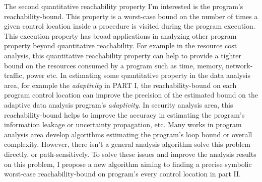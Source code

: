 The second quantitative reachability property I'm interested is the program's reachability-bound.
This property is a worst-case bound on the number of times a given control location 
 inside a procedure is visited during the program execution.
This execution property has broad
applications in analyzing other program property beyond quantitative reachability.
For example in the resource cost analysis, this quantitative reachability property
can help to provide a tighter
bound on the resources consumed by a program such as time, memory,
network-traffic, power etc.
In estimating some quantitative property
in the data analysis area, for example the \emph{adaptivity}
in PART I, the reachability-bound on each program control location
can improve the precision of the estimated bound on the adaptive data analysis program's \emph{adaptivity}.
In security analysis area, this reachability-bound helps to improve the accuracy
in estimating the program's information leakage or uncertainty propagation, etc.
Many works in program analysis area develop algorithms estimating the program's loop bound or overall complexity.
However, there isn't a general analysis algorithm solve this problem directly, or path-sensitively.
To solve these issues and improve the analysis results on this problem, I propose a new algorithm
aiming to finding a precise symbolic worst-case reachability-bound on program's every control location
in part II.



